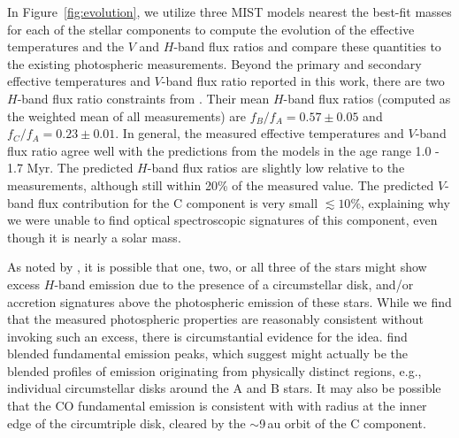 \documentclass[twocolumn]{aastex61}
\begin{document}
In Figure~\ref{fig:evolution}, we utilize three MIST models nearest the best-fit masses for each of the stellar components to compute the evolution of the effective temperatures and the $V$ and $H$-band flux ratios and compare these quantities to the existing photospheric measurements. Beyond the primary and secondary effective temperatures and $V$-band flux ratio reported in this work, there are two $H$-band flux ratio constraints from \citet{berger11}. Their mean $H$-band flux ratios (computed as the weighted mean of all measurements) are $f_B/f_A = 0.57 \pm 0.05$ and $f_C/f_A = 0.23 \pm 0.01$. In general, the measured effective temperatures and $V$-band flux ratio agree well with the predictions from the models in the age range 1.0 - 1.7 Myr. The predicted $H$-band flux ratios are slightly low relative to the \citet{berger11} measurements, although still within 20\% of the measured value.
The predicted $V$-band flux contribution for the C component is very small $\lesssim 10\%$, explaining why we were unable to find optical spectroscopic signatures of this component, even though it is nearly a solar mass.

As noted by \citet{berger11}, it is possible that one, two, or all three of the stars might show excess $H$-band emission due to the presence of a circumstellar disk, and/or accretion signatures above the photospheric emission of these stars. While we find that the measured photospheric properties are reasonably consistent without invoking such an excess, there is circumstantial evidence for the idea. \citep{najita03} find blended fundamental emission peaks, which \citet{bast11} suggest might actually be the blended profiles of emission originating from physically distinct regions, e.g., individual circumstellar disks around the A and B stars. It may also be possible that the CO fundamental emission is consistent with with radius at the inner edge of the circumtriple disk, cleared by the $\sim$9\,au orbit of the C component.
\end{document}
